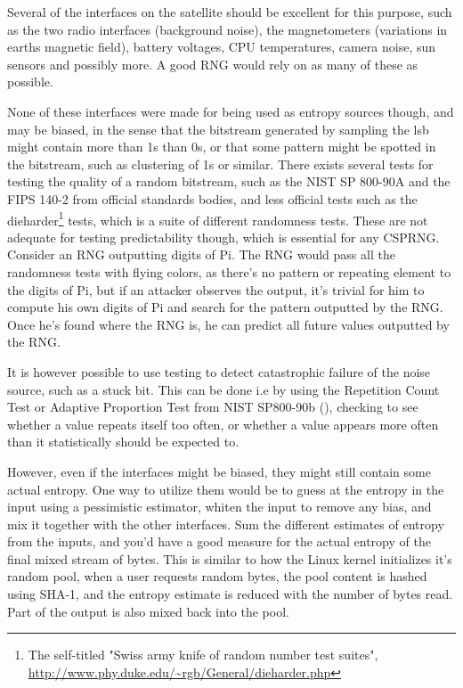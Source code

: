 Several of the interfaces on the satellite should be excellent for this purpose, such as the two radio interfaces (background noise), the magnetometers (variations in earths magnetic field), battery voltages, CPU temperatures, camera noise, sun sensors and possibly more. A good RNG would rely on as many of these as possible.

None of these interfaces were made for being used as entropy sources though, and may be biased, in the sense that the bitstream generated by sampling the \gls{lsb} might contain more than 1s than 0s, or that some pattern might be spotted in the bitstream, such as clustering of 1s or similar. There exists several tests for testing the quality of a random bitstream, such as the NIST SP 800-90A and the FIPS 140-2 from official standards bodies, and less official tests such as the dieharder\footnote{The self-titled "Swiss army knife of random number test suites", \url{http://www.phy.duke.edu/~rgb/General/dieharder.php}} tests, which is a suite of different randomness tests. These are not adequate for testing predictability though, which is essential for any CSPRNG. Consider an RNG outputting digits of Pi. The RNG would pass all the randomness tests with flying colors, as there's no pattern or repeating element to the digits of Pi, but if an attacker observes the output, it's trivial for him to compute his own digits of Pi and search for the pattern outputted by the RNG. Once he's found where the RNG is, he can predict all future values outputted by the RNG.

It is however possible to use testing to detect catastrophic failure of the noise source, such as a stuck bit. This can be done i.e by using the Repetition Count Test or Adaptive Proportion Test from NIST SP800-90b (\cite{sp800-90b}), checking to see whether a value repeats itself too often, or whether a value appears more often than it statistically should be expected to.

However, even if the interfaces might be biased, they might still contain some actual entropy. One way to utilize them would be to guess at the entropy in the input using a pessimistic estimator, whiten the input to remove any bias, and mix it together with the other interfaces. Sum the different estimates of entropy from the inputs, and you'd have a good measure for the actual entropy of the final mixed stream of bytes. This is similar to how the Linux kernel initializes it's random pool, when a user requests random bytes, the pool content is hashed using SHA-1, and the entropy estimate is reduced with the number of bytes read. Part of the output is also mixed back into the pool.

